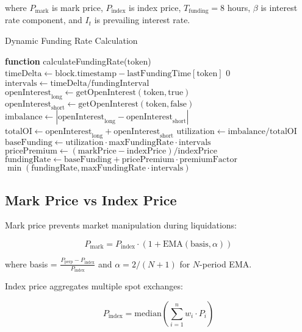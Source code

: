 \documentclass[11pt,a4paper]{article}
\begin{document}
where $P_{\text{mark}}$ is mark price, $P_{\text{index}}$ is index price, $T_{\text{funding}} = 8$ hours, $\beta$ is interest rate component, and $I_t$ is prevailing interest rate.

\begin{algorithm}
\caption{Dynamic Funding Rate Calculation}
\begin{algorithmic}[1]
\STATE \textbf{function} calculateFundingRate($\text{token}$)
\STATE $\text{timeDelta} \gets \text{block.timestamp} - \text{lastFundingTime}[\text{token}]$
    \RETURN $0$
\ENDIF
\STATE $\text{intervals} \gets \text{timeDelta} / \text{fundingInterval}$
\STATE $\text{openInterest}_{\text{long}} \gets \text{getOpenInterest}(\text{token}, \text{true})$
\STATE $\text{openInterest}_{\text{short}} \gets \text{getOpenInterest}(\text{token}, \text{false})$
\STATE $\text{imbalance} \gets |\text{openInterest}_{\text{long}} - \text{openInterest}_{\text{short}}|$
\STATE $\text{totalOI} \gets \text{openInterest}_{\text{long}} + \text{openInterest}_{\text{short}}$
\STATE $\text{utilization} \gets \text{imbalance} / \text{totalOI}$
\STATE $\text{baseFunding} \gets \text{utilization} \cdot \text{maxFundingRate} \cdot \text{intervals}$
\STATE $\text{pricePremium} \gets (\text{markPrice} - \text{indexPrice}) / \text{indexPrice}$
\STATE $\text{fundingRate} \gets \text{baseFunding} + \text{pricePremium} \cdot \text{premiumFactor}$
\RETURN $\min(\text{fundingRate}, \text{maxFundingRate} \cdot \text{intervals})$
\end{algorithmic}
\end{algorithm}

\subsection{Mark Price vs Index Price}

Mark price prevents market manipulation during liquidations:

\begin{equation}
P_{\text{mark}} = P_{\text{index}} \cdot (1 + \text{EMA}(\text{basis}, \alpha))
\end{equation}

where basis = $\frac{P_{\text{perp}} - P_{\text{index}}}{P_{\text{index}}}$ and $\alpha = 2/(N+1)$ for $N$-period EMA.

Index price aggregates multiple spot exchanges:

\begin{equation}
P_{\text{index}} = \text{median}\left(\sum_{i=1}^{n} w_i \cdot P_i\right)
\end{equation}
\end{document}
